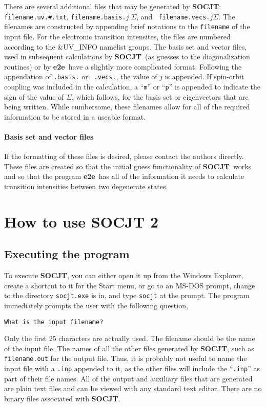 \documentclass{article}
\newcommand{\socjt}{{\bf SOCJT}}
\newcommand{\etoe}{{\bf e2e}}
\begin{document}
There are several additional files that may be generated by \socjt :
{\tt filename.uv.\#.txt}, {\tt filename.basis.}$j.\Sigma $, and {\tt
  filename.vecs.}$j\Sigma $. The filenames are constructed by
appending brief notations to the {\tt filename} of the input file. For
the electronic transition intensites, the files are numbered according
to the \&UV\_INFO namelist groups. The basis set and vector files,
used in subsequent calculations by \socjt\ (as guesses to the
diagonalization routines) or by \etoe\ have a slightly more
complicated format. Following the appendation of {\tt .basis.} or {\tt
  .vecs.}, the value of $j$ is appended. If spin-orbit coupling was
included in the calculation, a ``{\tt m}'' or ``{\tt p}'' is appended
to indicate the sign of the value of $\Sigma $, which follows, for the
basis set or eigenvectors that are being written. While cumbersome,
these filenames allow for all of the required information to be stored
in a useable format.


\paragraph{Basis set and vector files}

If the formatting of these files is desired, please contact the
authors directly. These files are created so that the initial guess
functionality of \socjt\ works and so that the program \etoe\ has all
of the information it needs to calculate transition intensities
between two degenerate states.

\section{How to use SOCJT 2} \label{section:howto}

\subsection{Executing the program}
To execute \socjt , you can either open it up from the Windows
Explorer, create a shortcut to it for the Start menu, or go to an
MS-DOS prompt, change to the directory {\tt socjt.exe} is in, and type
{\tt socjt} at the prompt. The program immediately prompts the user
with the following question,
\begin{verbatim}
What is the input filename?
\end{verbatim}
Only the first 25 characters are actually used. The
filename should be the name of the input file. The names of all the
other files generated by \socjt , such as {\tt filename.out} for the
output file. Thus, it is probably not useful to name the input file
with a {\tt .inp} appended to it, as the other files will include the
``{\tt .inp}'' as part of their file names. All of the output and
auxiliary files that are generated are plain text files and can be
viewed with any standard text editor. There are no binary files
associated with \socjt .
\end{document}
